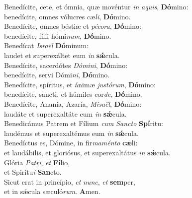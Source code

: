 \oddverse Benedícite, cete, et ómnia, quæ movéntur \textit{in} \textit{a}\textit{quis}, \textbf{Dó}mino:~\*\\
\oddverse benedícite, omnes vólucres cæ\textit{li}, \textbf{Dó}mino.\\
\evenverse Benedícite, omnes béstiæ et \textit{pé}\textit{co}\textit{ra}, \textbf{Dó}mino:~\*\\
\evenverse benedícite, fílii hómi\textit{num}, \textbf{Dó}mino.\\
\oddverse Benedícat \textit{Is}\textit{ra}\textit{ël} \textbf{Dó}minum:~\*\\
\oddverse laudet et superexáltet eum \textit{in} \textbf{sǽ}cula.\\
\evenverse Benedícite, sacerdótes \textit{Dó}\textit{mi}\textit{ni}, \textbf{Dó}mino:~\*\\
\evenverse benedícite, servi Dómi\textit{ni}, \textbf{Dó}mino.\\
\oddverse Benedícite, spíritus, et ánimæ \textit{ju}\textit{stó}\textit{rum}, \textbf{Dó}mino:~\*\\
\oddverse benedícite, sancti, et húmiles cor\textit{de}, \textbf{Dó}mino.\\
\evenverse Benedícite, Ananía, Azaría, \textit{Mí}\textit{sa}\textit{ël}, \textbf{Dó}mino:~\*\\
\evenverse laudáte et superexaltáte eum \textit{in} \textbf{sǽ}cula.\\
\oddverse Benedicámus Patrem et Fílium \textit{cum} \textit{San}\textit{cto} \textbf{Spí}ritu:~\*\\
\oddverse laudémus et superexaltémus eum \textit{in} \textbf{sǽ}cula.\\
\evenverse Benedíctus es, Dómine, in fir\textit{ma}\textit{mén}\textit{to} \textbf{cæ}li:~\*\\
\evenverse et laudábilis, et gloriósus, et superexaltátus \textit{in} \textbf{sǽ}cula.\\
\oddverse Glória \textit{Pa}\textit{tri}, \textit{et} \textbf{Fí}lio,~\*\\
\oddverse et Spirítu\textit{i} \textbf{San}cto.\\
\evenverse Sicut erat in princípio, \textit{et} \textit{nunc}, \textit{et} \textbf{sem}per,~\*\\
\evenverse et in sǽcula sæculó\textit{rum}. \textbf{A}men.\\
